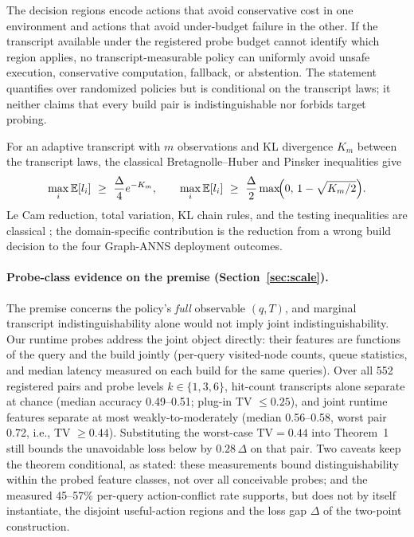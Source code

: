 \documentclass{article}
\newcommand{\TV}{\mathrm{TV}}
\newcommand{\E}{\mathbb{E}}
\begin{document}
The decision regions encode actions that avoid conservative cost in one environment and actions that avoid
under-budget failure in the other. If the transcript available under the registered probe budget cannot
identify which region applies, no transcript-measurable policy can uniformly avoid unsafe execution,
conservative computation, fallback, or abstention. The statement quantifies over randomized policies but is
conditional on the transcript laws; it neither claims that every build pair is indistinguishable nor
forbids target probing.

For an adaptive transcript with $m$ observations and KL divergence $K_m$ between the transcript laws, the
classical Bretagnolle--Huber and Pinsker inequalities give
\begin{equation}
\max_{i}\E[l_{i}]\ \ge\ \frac{\Delta}{4}e^{-K_{m}},\qquad
\max_{i}\E[l_{i}]\ \ge\ \frac{\Delta}{2}\max\!\Bigl(0,\,1-\sqrt{K_{m}/2}\Bigr).
\label{eq:bh}
\end{equation}
Le Cam reduction, total variation, KL chain rules, and the testing inequalities are classical
\citep{yu1997assouad}; the domain-specific contribution is the reduction from a wrong build decision to the
four Graph-ANNS deployment outcomes.

\paragraph{Probe-class evidence on the premise (Section~\ref{sec:scale}).}
The premise concerns the policy's \emph{full} observable $(q,T)$, and marginal transcript indistinguishability
alone would not imply joint indistinguishability. Our runtime probes address the joint object directly: their
features are functions of the query and the build jointly (per-query visited-node counts, queue statistics,
and median latency measured on each build for the same queries). Over all 552 registered pairs and probe
levels $k\in\{1,3,6\}$, hit-count transcripts alone separate at chance (median accuracy 0.49--0.51;
plug-in TV $\le0.25$), and joint runtime features separate at most weakly-to-moderately (median 0.56--0.58,
worst pair 0.72, i.e., TV $\ge0.44$). Substituting the worst-case $\TV=0.44$ into Theorem~1 still bounds
the unavoidable loss below by $0.28\,\Delta$ on that pair. Two caveats keep the theorem conditional, as
stated: these measurements bound distinguishability within the probed feature classes, not over all
conceivable probes; and the measured 45--57\% per-query action-conflict rate supports, but does not by
itself instantiate, the disjoint useful-action regions and the loss gap $\Delta$ of the two-point
construction.
\end{document}

